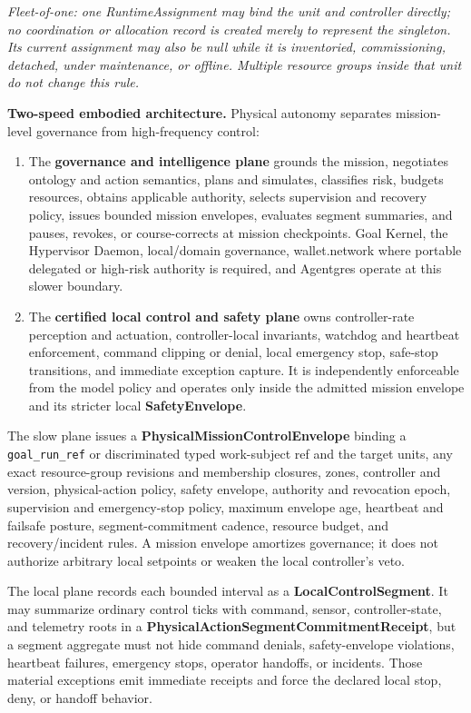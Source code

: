 \documentclass[
  11pt,
]{article}
\begin{document}
\emph{Fleet-of-one: one RuntimeAssignment may bind the unit and controller
directly; no coordination or allocation record is created merely to represent
the singleton. Its current assignment may also be null while it is inventoried,
commissioning, detached, under maintenance, or offline. Multiple resource
groups inside that unit do not change this rule.}

\textbf{Two-speed embodied architecture.} Physical autonomy separates
mission-level governance from high-frequency control:

\begin{enumerate}
\def\labelenumi{\arabic{enumi}.}
\item
  The \textbf{governance and intelligence plane} grounds the mission,
  negotiates ontology and action semantics, plans and simulates, classifies
  risk, budgets resources, obtains applicable authority, selects supervision
  and recovery policy, issues bounded mission envelopes, evaluates segment
  summaries, and pauses, revokes, or course-corrects at mission checkpoints.
  Goal Kernel, the Hypervisor Daemon, local/domain governance,
  wallet.network where portable delegated or high-risk authority is required,
  and Agentgres operate at this slower boundary.
\item
  The \textbf{certified local control and safety plane} owns controller-rate
  perception and actuation, controller-local invariants, watchdog and
  heartbeat enforcement, command clipping or denial, local emergency stop,
  safe-stop transitions, and immediate exception capture. It is independently
  enforceable from the model policy and operates only inside the admitted
  mission envelope and its stricter local \textbf{SafetyEnvelope}.
\end{enumerate}

The slow plane issues a \textbf{PhysicalMissionControlEnvelope} binding a
\texttt{goal\_run\_ref} or discriminated typed work-subject ref and the target
units, any exact resource-group revisions and membership
closures, zones, controller and version, physical-action
policy, safety envelope, authority and revocation epoch, supervision and
emergency-stop policy, maximum envelope age, heartbeat and failsafe posture,
segment-commitment cadence, resource budget, and recovery/incident rules. A
mission envelope amortizes governance; it does not authorize arbitrary local
setpoints or weaken the local controller's veto.

The local plane records each bounded interval as a
\textbf{LocalControlSegment}. It may summarize ordinary control ticks with
command, sensor, controller-state, and telemetry roots in a
\textbf{PhysicalActionSegmentCommitmentReceipt}, but a segment aggregate must
not hide command denials, safety-envelope violations, heartbeat failures,
emergency stops, operator handoffs, or incidents. Those material exceptions
emit immediate receipts and force the declared local stop, deny, or handoff
behavior.
\end{document}

